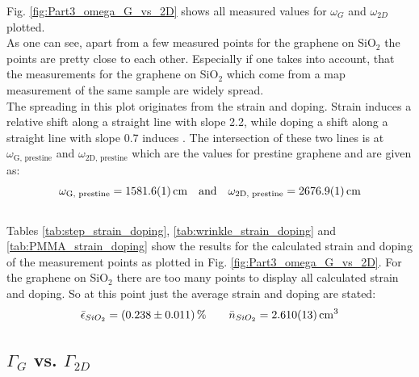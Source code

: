 \documentclass[12pt,a4paper]{article}
\begin{document}
Fig. \ref{fig:Part3_omega_G_vs_2D} shows all measured values for $\omega _G$ and $\omega _{2D}$ plotted. \\
As one can see, apart from a few measured points for the graphene on SiO$_2$ the points are pretty close to each other. Especially if one takes into account, that the measurements for the graphene on SiO$_2$ which come from a map measurement of the same sample are widely spread. \\
The spreading in this plot originates from the strain and doping. Strain induces a relative shift along a straight line with slope 2.2, while doping a shift along a straight line with slope 0.7 induces \cite{NeumannStampfer}. The intersection of these two lines is at $\omega _{\text{G, prestine}}$ and $\omega _{\text{2D, prestine}}$ which are the values for prestine graphene and are given as: 
\begin{equation*}
\omega _{\text{G, prestine}} = \SI{1581.6 \pm 0.1}{\per cm} \quad \text{and} \quad \omega _{\text{2D, prestine}} = \SI{2676.9 \pm 0.1}{\per cm}
\end{equation*} \\

Tables \ref{tab:step_strain_doping}, \ref{tab:wrinkle_strain_doping} and \ref{tab:PMMA_strain_doping} show the results for the calculated strain and doping of the measurement points as plotted in Fig. \ref{fig:Part3_omega_G_vs_2D}.  For the graphene on SiO$_2$ there are too many points to display all calculated strain and doping. So at this point just the average strain and doping are stated:
\begin{equation*}
\bar{\epsilon} _{SiO_2} = (0.238 \pm 0.011) \, \% \qquad \bar{n} _{SiO_2} = \SI{2.610 \pm 0.013}{\per c \cubic m}
\end{equation*}


\subsection{$\Gamma _G$ vs. $\Gamma _{2D}$}
\end{document}
